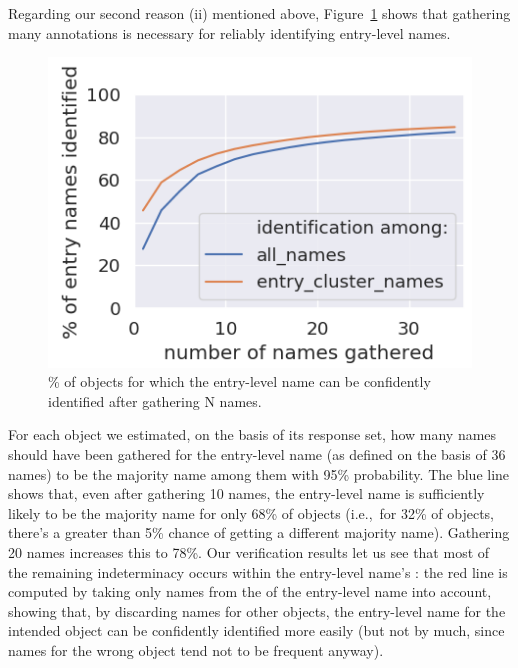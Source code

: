 Regarding our second reason (ii) mentioned above, Figure~\ref{fig:entry-level-name-stability} shows that gathering many annotations is necessary for reliably identifying entry-level names.
\begin{figure}[t]
	\centering
	\includegraphics[width=.7\columnwidth]{images/stability_analytic.png}
	\caption{\% of objects for which the entry-level name can be confidently identified after gathering N names.}
	\label{fig:entry-level-name-stability}
\end{figure}
For each object we estimated, on the basis of its \mn response set, how many names should have been gathered for the entry-level name (as defined on the basis of 36 names) to be the majority name among them with 95\% probability.
The blue line shows that, even after gathering 10 names, the entry-level name is sufficiently likely to be the majority name for only 68\% of objects (i.e.,~for 32\% of objects, there's a greater than 5\% chance of getting a different majority name).
Gathering 20 names increases this to 78\%.
Our verification results let us see that most of the remaining indeterminacy occurs within the entry-level name's \cluster:
the red line is computed by taking only names from the \cluster of the entry-level name into account, showing that, by discarding names for other objects, the entry-level name for the intended object can be confidently identified more easily (but not by much, since names for the wrong object tend not to be frequent anyway).

